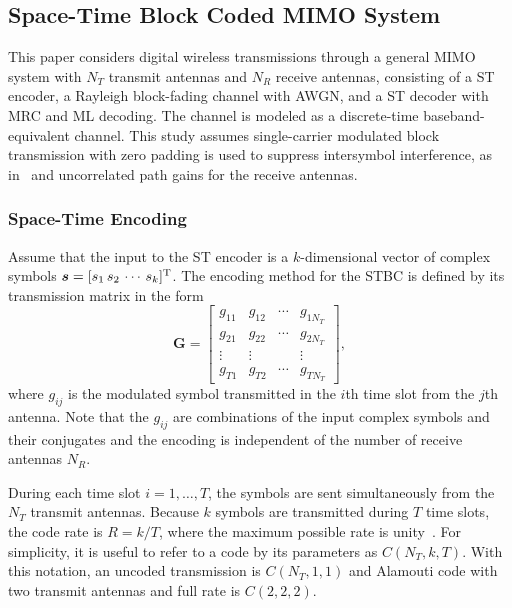 \subsection{Space-Time Block Coded MIMO System}
This paper considers digital wireless transmissions through a general MIMO system with $N_T$ transmit antennas and $N_R$ receive antennas, consisting of a ST encoder, a Rayleigh block-fading channel with AWGN, and a ST decoder with MRC and ML decoding. The channel is modeled as a discrete-time baseband-equivalent channel. This study assumes single-carrier modulated block transmission with zero padding is used to suppress intersymbol interference, as in~\cite{wang00,wang04} and uncorrelated path gains for the receive antennas.

\subsubsection{Space-Time Encoding}
Assume that the input to the ST encoder is a $k$-dimensional vector of complex symbols $\bm{s}=[s_1\,s_2\,\cdots\,s_k]^\text{T}$. The encoding method for the STBC is defined by its transmission matrix in the form 
\[ \bm{G} = \begin{bmatrix}
  g_{11} & g_{12} & \cdots & g_{1N_T} \\
  g_{21} & g_{22} & \cdots & g_{2N_T} \\
  \vdots & \vdots &       & \vdots \\
  g_{T1} & g_{T2} & \cdots & g_{TN_T}
\end{bmatrix}, \]
where $g_{ij}$ is the modulated symbol transmitted in the $i$th time slot from the $j$th antenna. Note that the $g_{ij}$ are combinations of the input complex symbols and their conjugates and the encoding is independent of the number of receive antennas $N_R$.

During each time slot $i=1,\dots,T$, the symbols are sent simultaneously from the $N_T$ transmit antennas. Because $k$ symbols are transmitted during $T$ time slots, the code rate is $R=k/T$, where the maximum possible rate is unity~\cite{tarokh99}. For simplicity, it is useful to refer to a code by its parameters as $C(N_T,k,T)$. With this notation, an uncoded transmission is $C(N_T,1,1)$ and Alamouti code with two transmit antennas and full rate is $C(2,2,2)$.

